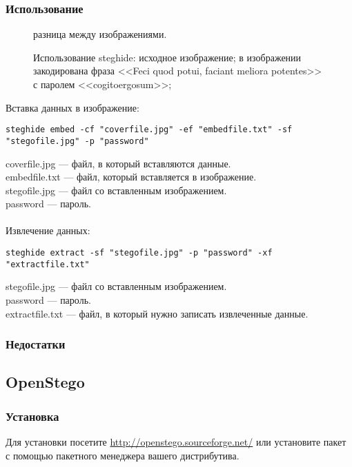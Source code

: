 \subsubsection{Использование}
\begin{figure}[ht!]
\vspace{-4ex}
\centering
{}
\hspace{4ex}
\hspace{4ex}
\caption{Использование steghide: 
 исходное изображение; 
 в изображении закодирована фраза <<Feci quod potui, faciant meliora potentes>> с паролем <<cogitoergosum>>; 
} разница между изображениями.
\end{figure}
Вставка данных в изображение:
\begin{lstlisting}
steghide embed -cf "coverfile.jpg" -ef "embedfile.txt" -sf "stegofile.jpg" -p "password"
\end{lstlisting}
coverfile.jpg --- файл, в который вставляются данные.\\
embedfile.txt --- файл, который вставляется в изображение.\\
stegofile.jpg --- файл со вставленным изображением.\\
password --- пароль.\\\\
Извлечение данных:
\begin{lstlisting}
steghide extract -sf "stegofile.jpg" -p "password" -xf "extractfile.txt"
\end{lstlisting}
stegofile.jpg --- файл со вставленным изображением.\\
password --- пароль.\\
extractfile.txt --- файл, в который нужно записать извлеченные данные.
\subsubsection{Недостатки}
\subsection{OpenStego}
\subsubsection{Установка}
Для установки посетите \url{http://openstego.sourceforge.net/} или установите пакет с помощью пакетного менеджера вашего дистрибутива.
